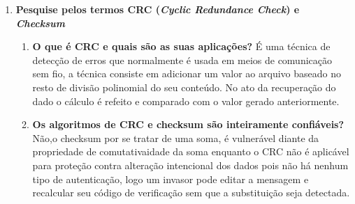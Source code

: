 \documentclass{abntex2}
\begin{document}
  \begin{enumerate}
    \item \textbf{Pesquise pelos termos CRC (\textit{Cyclic Redundance Check}) e \textit{Checksum}}
    \begin{enumerate}
      \item \textbf{O que é CRC e quais são as suas aplicações?} \newline
      É uma técnica de detecção de erros que normalmente é usada em meios de comunicação sem fio, a técnica consiste em adicionar um valor ao arquivo baseado no resto de divisão polinomial do seu conteúdo. No ato da recuperação do dado o cálculo é refeito e comparado com o valor gerado anteriormente.
      \item \textbf{Os algoritmos de CRC e checksum são inteiramente confiáveis?} \newline
      Não,o checksum por se tratar de uma soma, é vulnerável diante da propriedade de comutativaidade da soma enquanto o CRC não é aplicável para proteção contra alteração intencional dos dados pois não há nenhum tipo de autenticação, logo um invasor pode editar a mensagem e recalcular seu código de verificação sem que a substituição seja detectada.


\end{enumerate}
\end{enumerate}
\end{document}
